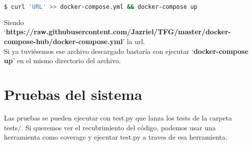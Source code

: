 \lstset{style=linestyle}
\begin{lstlisting}[language=bash]
$ curl 'URL' >> docker-compose.yml && docker-compose up
\end{lstlisting}

Siendo `\textbf{https://raw.githubusercontent.com/Jazriel/TFG/master/docker-compose-hub/docker-compose.yml}' la url.
\hphantom{sin esto quedaba mal}\\

Si ya tuviésemos ese archivo descargado bastaría con ejecutar `\textbf{docker-compose up}' en el mismo directorio del archivo.

\section{Pruebas del sistema}

Las pruebas se pueden ejecutar con test.py que lanza los tests de la carpeta tests/. Si queremos ver el recubrimiento del código, podemos usar una herramienta como coverage y ejecutar test.py a traves de esa herramienta.  


